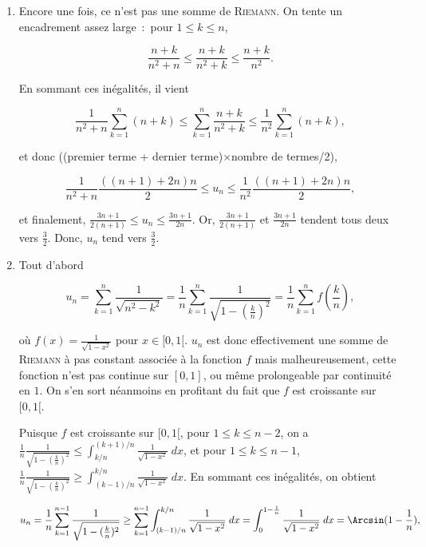{{\begin{enumerate}
Posons $v_n=\frac{1}{n!}\prod_{k=1}^{n}(a+k)$ puis $u_n=\sqrt[n]{v_n}$.

$$\frac{v_{n+1}}{v_n}=\frac{a+n+1}{n+1}\rightarrow1,$$

et donc $\lim_{n\rightarrow +\infty}u_n=1$.

\item  Encore une fois, ce n'est pas une somme de \textsc{Riemann}. On tente un encadrement assez large~:~pour $1\leq k\leq n$, 

$$\frac{n+k}{n^2+n}\leq\frac{n+k}{n^2+k}\leq\frac{n+k}{n^2}.$$

En sommant ces inégalités, il vient 

$$\frac{1}{n^2+n}\sum_{k=1}^{n}(n+k)\leq\sum_{k=1}^{n}\frac{n+k}{n^2+k}\leq\frac{1}{n^2}\sum_{k=1}^{n}(n+k),$$

et donc ((premier terme + dernier terme)$\times$nombre de termes/2),

$$\frac{1}{n^2+n}\frac{((n+1)+2n)n}{2}\leq u_n\leq\frac{1}{n^2}\frac{((n+1)+2n)n}{2},$$

et finalement, $\frac{3n+1}{2(n+1)}\leq u_n\leq\frac{3n+1}{2n}$. Or, $\frac{3n+1}{2(n+1)}$ et $\frac{3n+1}{2n}$ tendent tous deux vers $\frac{3}{2}$. Donc, $u_n$ tend vers $\frac{3}{2}$.

\item  Tout d'abord

$$u_n=\sum_{k=1}^{n}\frac{1}{\sqrt{n^2-k^2}}=\frac{1}{n}\sum_{k=1}^{n}\frac{1}{\sqrt{1-(\frac{k}{n})^2}}=
\frac{1}{n}\sum_{k=1}^{n}f(\frac{k}{n}),$$ 

où $f(x)=\frac{1}{\sqrt{1-x^2}}$ pour $x\in[0,1[$. $u_n$ est donc effectivement une somme de \textsc{Riemann} à pas constant associée à la fonction $f$ mais malheureusement, cette fonction n'est pas continue sur $[0,1]$, ou même prolongeable par continuité en $1$. On s'en sort néanmoins en profitant du fait que $f$ est croissante sur $[0,1[$.

Puisque $f$ est croissante sur $[0,1[$, pour $1\leq k\leq n-2$, on a $\frac{1}{n}\frac{1}{\sqrt{1-(\frac{k}{n})^2}}\leq\int_{k/n}^{(k+1)/n}\frac{1}{\sqrt{1-x^2}}\;dx$, et pour $1\leq k\leq n-1$, $\frac{1}{n}\frac{1}{\sqrt{1-(\frac{k}{n})^2}}\geq\int_{(k-1)/n}^{k/n}\frac{1}{\sqrt{1-x^2}}\;dx$. En sommant ces inégalités, on obtient

$$u_n=\frac{1}{n}\sum_{k=1}^{n-1}\frac{1}{\sqrt{1-(\frac{k}{n})^2}}\geq\sum_{k=1}^{n-1}\int_{(k-1)/n}^{k/n}\frac{1}{\sqrt{1-x^2}}\;dx=\int_{0}^{1-\frac{1}{n}}\frac{1}{\sqrt{1-x^2}}\;dx=\Arcsin(1-\frac{1}{n}),$$


\end{enumerate}}}
